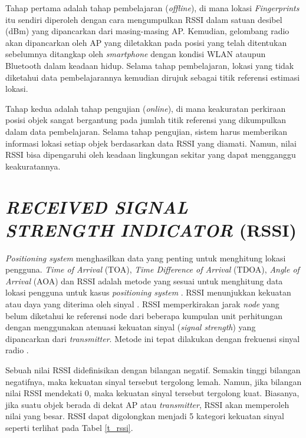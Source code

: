 \par Tahap pertama adalah tahap pembelajaran (\textit{offline}), di mana lokasi \textit{Fingerprints} itu sendiri diperoleh dengan cara mengumpulkan RSSI dalam satuan desibel (dBm) yang dipancarkan dari masing-masing AP. Kemudian, gelombang radio akan dipancarkan oleh AP yang diletakkan pada posisi yang telah ditentukan sebelumnya ditangkap oleh \textit{smartphone} dengan kondisi WLAN ataupun Bluetooth dalam keadaan hidup. Selama tahap pembelajaran, lokasi yang tidak diketahui data pembelajarannya kemudian dirujuk sebagai titik referensi estimasi lokasi.
\newline
\par Tahap kedua adalah tahap pengujian (\textit{online}), di mana keakuratan perkiraan posisi objek sangat bergantung pada jumlah titik referensi yang dikumpulkan dalam data pembelajaran. Selama tahap pengujian, sistem harus memberikan informasi lokasi setiap objek berdasarkan data RSSI yang diamati. Namun, nilai RSSI bisa dipengaruhi oleh keadaan lingkungan sekitar yang dapat mengganggu keakuratannya.

\section{\uppercase{\textit{RECEIVED SIGNAL STRENGTH INDICATOR} (RSSI)}}
\textit{Positioning system} menghasilkan data yang penting untuk menghitung lokasi pengguna. \textit{Time of Arrival} (TOA), \textit{Time Difference of Arrival} (TDOA), \textit{Angle of Arrival} (AOA) dan RSSI adalah metode yang sesuai untuk menghitung data lokasi pengguna untuk kasus \textit{positioning system} \citep{Liu2007}. RSSI menunjukkan kekuatan atau daya yang diterima oleh sinyal \citep{Kajioka2014}. RSSI memperkirakan jarak \textit{node} yang belum diketahui ke referensi node dari beberapa kumpulan unit perhitungan dengan menggunakan atenuasi kekuatan sinyal (\textit{signal strength}) yang dipancarkan dari \textit{transmitter}. Metode ini tepat dilakukan dengan frekuensi sinyal radio \citep{Schneegans2007}.

\par Sebuah nilai RSSI didefinisikan dengan bilangan negatif. Semakin tinggi bilangan negatifnya, maka kekuatan sinyal tersebut tergolong lemah. Namun, jika bilangan nilai RSSI mendekati 0, maka kekuatan sinyal tersebut tergolong kuat. Biasanya, jika suatu objek berada di dekat AP atau \textit{transmitter}, RSSI akan memperoleh nilai yang besar. RSSI dapat digolongkan menjadi 5 kategori kekuatan sinyal seperti terlihat pada Tabel \ref{t_rssi}.

